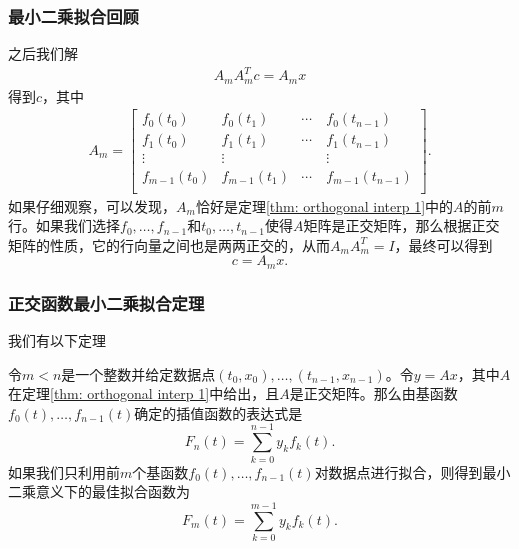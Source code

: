 \documentclass[10pt]{beamer}
\begin{document}
\begin{frame}
\frametitle{最小二乘拟合回顾}
之后我们解
\begin{align}
A_m A_m^T c = A_m x
\end{align}
得到$c$，其中
\begin{align}
A_m = \left[ \begin{array}{cccc}
     f_0(t_0)    & f_0(t_1) & \cdots  & f_0(t_{n-1})  \\
     f_1(t_0)    & f_1(t_1) & \cdots  & f_1(t_{n-1})  \\
     \vdots       & \vdots   &  \quad  & \vdots  \\
     f_{m-1}(t_0)    & f_{m-1}(t_1) & \cdots  & f_{m-1}(t_{n-1})  \\                
            \end{array} \right] .
\end{align}
如果仔细观察，可以发现，$A_m$恰好是定理\ref{thm: orthogonal interp 1}中的$A$的前$m$行。如果我们选择$f_0, \ldots, f_{n-1}$和$t_0, \ldots, t_{n-1}$使得$A$矩阵是正交矩阵，那么根据正交矩阵的性质，它的行向量之间也是两两正交的，从而$A_m A_m^T = I$，最终可以得到
\begin{equation}
c = A_m x.
\end{equation}
\end{frame}


\begin{frame}
\frametitle{正交函数最小二乘拟合定理}
我们有以下定理
\begin{theorem}[正交函数插值和最小二乘拟合定理]
\label{thm: orthogonal interp and least square fit 1}
令$m<n$是一个整数并给定数据点$(t_0, x_0), \ldots, (t_{n-1}, x_{n-1})$。令$y = Ax$，其中$A$在定理\ref{thm: orthogonal interp 1}中给出，且$A$是正交矩阵。那么由基函数$f_0(t), \ldots, f_{n-1}(t)$确定的插值函数的表达式是
\begin{equation}
F_n(t) = \sum_{k=0}^{n-1} y_k f_k(t).
\end{equation}
如果我们只利用前$m$个基函数$f_0(t), \ldots, f_{n-1}(t)$对数据点进行拟合，则得到最小二乘意义下的最佳拟合函数为
\begin{equation}
F_m(t) = \sum_{k=0}^{m-1} y_k f_k(t).
\end{equation}
\end{theorem}
\end{frame}
\end{document}
